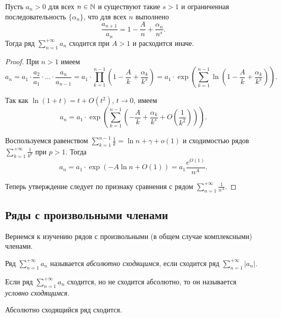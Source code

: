 
\begin{theorem}
    Пусть $a_{n} > 0$ для всех $n \in \mathbb{N}$ и существуют такие $s > 1$ и ограниченная последовательность $\{\alpha_{n}\}$, что для всех $n$ выполнено
    \[\frac{a_{n+1}}{a_{n}} = 1 - \frac{A}{n} + \frac{\alpha_{n}}{n^{s}}.\]
    Тогда ряд $\sum_{n = 1}^{+\infty} a_{n}$ сходится при $A > 1$ и расходится иначе. 
\end{theorem}

\begin{proof}
    При $n > 1$ имеем
    \[a_{n} = a_{1}\cdot \frac{a_{2}}{a_{1}}\cdot \ldots \cdot \frac{a_{n}}{a_{n - 1}} = a_{1}\cdot\prod_{k = 1}^{n - 1}\left(1 - \frac{A}{k} + \frac{\alpha_{k}}{k^{s}}\right) = a_{1}\cdot \exp\left(\sum_{k = 1}^{n-1} \ln(1 - \frac{A}{k} + \frac{\alpha_{k}}{k^{s}})\right).\]
    
    Так как $\ln(1 + t) = t + O(t^{2})$, $t \to 0$, имеем
    \[a_{n} = a_{1}\cdot \exp\left(\sum_{k = 1}^{n - 1}\left(-\frac{A}{k} + \frac{\alpha_{k}}{k^{s}} + O\left(\frac{1}{k^{2}}\right)\right)\right).\]
    
    Воспользуемся равенством $\sum_{k = 1}^{n - 1} \frac{1}{k} = \ln n + \gamma + o(1)$ и сходимостью рядов $\sum_{k = 1}^{+\infty}\frac{1}{k^{p}}$ при $p > 1$. Тогда
    \[a_{n} = a_{1}\cdot \exp\left(-A \ln n + O(1)\right) = a_{1} \frac{e^{O(1)}}{n^{A}}.\]
    
    Теперь утверждение следует по признаку сравнения с рядом $\sum_{n = 1}^{+\infty}\frac{1}{n^{A}}$.
\end{proof}

\subsection{Ряды с произвольными членами}

Вернемся к изучению рядов с произвольными (в общем случае комплексными) членами.

\begin{definition}
    Ряд $\sum_{n = 1}^{+\infty}a_{n}$ называется \textit{абсолютно сходящимся}, если сходится ряд $\sum_{n = 1}^{+\infty}|a_{n}|$.

    Если ряд $\sum_{n = 1}^{+\infty}a_{n}$ сходится, но не сходится абсолютно, то он называется \textit{условно сходящимся}. 
\end{definition}

\begin{corollary}
    Абсолютно сходящийся ряд сходится.
\end{corollary}

